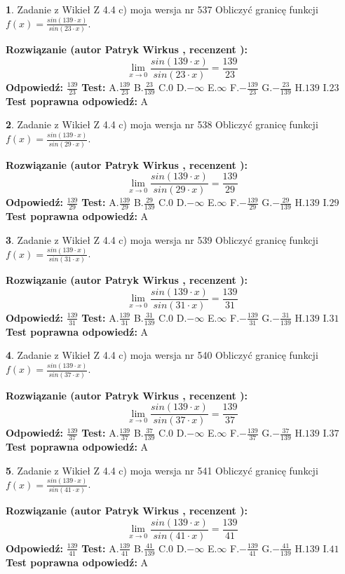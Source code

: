 \documentclass[12pt, a4paper]{article}
\theoremstyle{definition} %
\newtheorem{zad}{}
\newcommand{\zadStart}[1]{\begin{zad}#1\newline}
\newcommand{\zadStop}{\end{zad}}
\newcommand{\rozwStart}[2]{\noindent \textbf{Rozwiązanie (autor #1 , recenzent #2): }\newline}
\newcommand{\rozwStop}{\newline}
\newcommand{\odpStart}{\noindent \textbf{Odpowiedź:}\newline}
\newcommand{\odpStop}{\newline}
\newcommand{\testStart}{\noindent \textbf{Test:}\newline}
\newcommand{\testStop}{\newline}
\newcommand{\kluczStart}{\noindent \textbf{Test poprawna odpowiedź:}\newline}
\newcommand{\kluczStop}{\newline}
\begin{document}
\zadStart{Zadanie z Wikieł Z 4.4 c) moja wersja nr 537}
Obliczyć granicę funkcji $f(x)=\frac{sin(139\cdot x)}{sin(23\cdot x)}$.
\zadStop
\rozwStart{Patryk Wirkus}{}
$$\lim\limits_{x\to 0}\frac{sin(139\cdot x)}{sin(23\cdot x)}=
\frac{139}{23}$$
\rozwStop
\odpStart
$\frac{139}{23}$
\odpStop
\testStart
A.$\frac{139}{23}$
B.$\frac{23}{139}$
C.$0$
D.$-\infty$
E.$\infty$
F.$-\frac{139}{23}$
G.$-\frac{23}{139}$
H.$139$
I.$23$
\testStop
\kluczStart
A
\kluczStop



\zadStart{Zadanie z Wikieł Z 4.4 c) moja wersja nr 538}
Obliczyć granicę funkcji $f(x)=\frac{sin(139\cdot x)}{sin(29\cdot x)}$.
\zadStop
\rozwStart{Patryk Wirkus}{}
$$\lim\limits_{x\to 0}\frac{sin(139\cdot x)}{sin(29\cdot x)}=
\frac{139}{29}$$
\rozwStop
\odpStart
$\frac{139}{29}$
\odpStop
\testStart
A.$\frac{139}{29}$
B.$\frac{29}{139}$
C.$0$
D.$-\infty$
E.$\infty$
F.$-\frac{139}{29}$
G.$-\frac{29}{139}$
H.$139$
I.$29$
\testStop
\kluczStart
A
\kluczStop



\zadStart{Zadanie z Wikieł Z 4.4 c) moja wersja nr 539}
Obliczyć granicę funkcji $f(x)=\frac{sin(139\cdot x)}{sin(31\cdot x)}$.
\zadStop
\rozwStart{Patryk Wirkus}{}
$$\lim\limits_{x\to 0}\frac{sin(139\cdot x)}{sin(31\cdot x)}=
\frac{139}{31}$$
\rozwStop
\odpStart
$\frac{139}{31}$
\odpStop
\testStart
A.$\frac{139}{31}$
B.$\frac{31}{139}$
C.$0$
D.$-\infty$
E.$\infty$
F.$-\frac{139}{31}$
G.$-\frac{31}{139}$
H.$139$
I.$31$
\testStop
\kluczStart
A
\kluczStop



\zadStart{Zadanie z Wikieł Z 4.4 c) moja wersja nr 540}
Obliczyć granicę funkcji $f(x)=\frac{sin(139\cdot x)}{sin(37\cdot x)}$.
\zadStop
\rozwStart{Patryk Wirkus}{}
$$\lim\limits_{x\to 0}\frac{sin(139\cdot x)}{sin(37\cdot x)}=
\frac{139}{37}$$
\rozwStop
\odpStart
$\frac{139}{37}$
\odpStop
\testStart
A.$\frac{139}{37}$
B.$\frac{37}{139}$
C.$0$
D.$-\infty$
E.$\infty$
F.$-\frac{139}{37}$
G.$-\frac{37}{139}$
H.$139$
I.$37$
\testStop
\kluczStart
A
\kluczStop



\zadStart{Zadanie z Wikieł Z 4.4 c) moja wersja nr 541}
Obliczyć granicę funkcji $f(x)=\frac{sin(139\cdot x)}{sin(41\cdot x)}$.
\zadStop
\rozwStart{Patryk Wirkus}{}
$$\lim\limits_{x\to 0}\frac{sin(139\cdot x)}{sin(41\cdot x)}=
\frac{139}{41}$$
\rozwStop
\odpStart
$\frac{139}{41}$
\odpStop
\testStart
A.$\frac{139}{41}$
B.$\frac{41}{139}$
C.$0$
D.$-\infty$
E.$\infty$
F.$-\frac{139}{41}$
G.$-\frac{41}{139}$
H.$139$
I.$41$
\testStop
\kluczStart
A
\kluczStop
\end{document}
